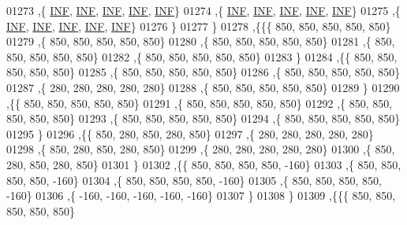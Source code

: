 \begin{DoxyCode}
01273    ,\{   \mbox{\hyperlink{1_88_84__epars_8h_a12c2040f25d8e3a7b9e1c2024c618cb6}{INF}},   \mbox{\hyperlink{1_88_84__epars_8h_a12c2040f25d8e3a7b9e1c2024c618cb6}{INF}},   \mbox{\hyperlink{1_88_84__epars_8h_a12c2040f25d8e3a7b9e1c2024c618cb6}{INF}},   \mbox{\hyperlink{1_88_84__epars_8h_a12c2040f25d8e3a7b9e1c2024c618cb6}{INF}},   \mbox{\hyperlink{1_88_84__epars_8h_a12c2040f25d8e3a7b9e1c2024c618cb6}{INF}}\}
01274    ,\{   \mbox{\hyperlink{1_88_84__epars_8h_a12c2040f25d8e3a7b9e1c2024c618cb6}{INF}},   \mbox{\hyperlink{1_88_84__epars_8h_a12c2040f25d8e3a7b9e1c2024c618cb6}{INF}},   \mbox{\hyperlink{1_88_84__epars_8h_a12c2040f25d8e3a7b9e1c2024c618cb6}{INF}},   \mbox{\hyperlink{1_88_84__epars_8h_a12c2040f25d8e3a7b9e1c2024c618cb6}{INF}},   \mbox{\hyperlink{1_88_84__epars_8h_a12c2040f25d8e3a7b9e1c2024c618cb6}{INF}}\}
01275    ,\{   \mbox{\hyperlink{1_88_84__epars_8h_a12c2040f25d8e3a7b9e1c2024c618cb6}{INF}},   \mbox{\hyperlink{1_88_84__epars_8h_a12c2040f25d8e3a7b9e1c2024c618cb6}{INF}},   \mbox{\hyperlink{1_88_84__epars_8h_a12c2040f25d8e3a7b9e1c2024c618cb6}{INF}},   \mbox{\hyperlink{1_88_84__epars_8h_a12c2040f25d8e3a7b9e1c2024c618cb6}{INF}},   \mbox{\hyperlink{1_88_84__epars_8h_a12c2040f25d8e3a7b9e1c2024c618cb6}{INF}}\}
01276    \}
01277   \}
01278  ,\{\{\{   850,   850,   850,   850,   850\}
01279    ,\{   850,   850,   850,   850,   850\}
01280    ,\{   850,   850,   850,   850,   850\}
01281    ,\{   850,   850,   850,   850,   850\}
01282    ,\{   850,   850,   850,   850,   850\}
01283    \}
01284   ,\{\{   850,   850,   850,   850,   850\}
01285    ,\{   850,   850,   850,   850,   850\}
01286    ,\{   850,   850,   850,   850,   850\}
01287    ,\{   280,   280,   280,   280,   280\}
01288    ,\{   850,   850,   850,   850,   850\}
01289    \}
01290   ,\{\{   850,   850,   850,   850,   850\}
01291    ,\{   850,   850,   850,   850,   850\}
01292    ,\{   850,   850,   850,   850,   850\}
01293    ,\{   850,   850,   850,   850,   850\}
01294    ,\{   850,   850,   850,   850,   850\}
01295    \}
01296   ,\{\{   850,   280,   850,   280,   850\}
01297    ,\{   280,   280,   280,   280,   280\}
01298    ,\{   850,   280,   850,   280,   850\}
01299    ,\{   280,   280,   280,   280,   280\}
01300    ,\{   850,   280,   850,   280,   850\}
01301    \}
01302   ,\{\{   850,   850,   850,   850,  -160\}
01303    ,\{   850,   850,   850,   850,  -160\}
01304    ,\{   850,   850,   850,   850,  -160\}
01305    ,\{   850,   850,   850,   850,  -160\}
01306    ,\{  -160,  -160,  -160,  -160,  -160\}
01307    \}
01308   \}
01309  ,\{\{\{   850,   850,   850,   850,   850\}

\end{DoxyCode}
